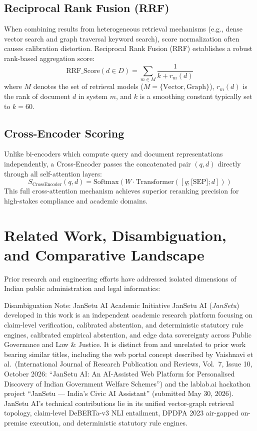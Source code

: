 \documentclass[12pt,a4paper,oneside]{report}
\begin{document}
\subsection{Reciprocal Rank Fusion (RRF)}
When combining results from heterogeneous retrieval mechanisms (e.g., dense vector search and graph traversal keyword search), score normalization often causes calibration distortion. Reciprocal Rank Fusion (RRF) establishes a robust rank-based aggregation score:
\begin{equation}
    \text{RRF\_Score}(d \in D) = \sum_{m \in M} \frac{1}{k + r_m(d)}
\end{equation}
where $M$ denotes the set of retrieval models ($M = \{\text{Vector}, \text{Graph}\}$), $r_m(d)$ is the rank of document $d$ in system $m$, and $k$ is a smoothing constant typically set to $k=60$.

\subsection{Cross-Encoder Scoring}
Unlike bi-encoders which compute query and document representations independently, a Cross-Encoder passes the concatenated pair $(q, d)$ directly through all self-attention layers:
\begin{equation}
    S_{\text{CrossEncoder}}(q, d) = \text{Softmax}(W \cdot \text{Transformer}([q; \text{[SEP]}; d]))
\end{equation}
This full cross-attention mechanism achieves superior reranking precision for high-stakes compliance and academic domains.

\section{Related Work, Disambiguation, and Comparative Landscape}
Prior research and engineering efforts have addressed isolated dimensions of Indian public administration and legal informatics:

\begin{infobox}{Disambiguation Note: JanSetu AI Academic Initiative}
JanSetu AI (\textit{JanSetu}) developed in this work is an independent academic research platform focusing on claim-level verification, calibrated abstention, and deterministic statutory rule engines, calibrated empirical abstention, and edge data sovereignty across Public Governance and Law \& Justice. It is distinct from and unrelated to prior work bearing similar titles, including the web portal concept described by Vaishnavi et al.\ (International Journal of Research Publication and Reviews, Vol.\ 7, Issue 10, October 2026: ``JanSetu AI: An AI-Assisted Web Platform for Personalised Discovery of Indian Government Welfare Schemes'') and the lablab.ai hackathon project ``JanSetu --- India's Civic AI Assistant'' (submitted May 30, 2026). JanSetu AI's technical contributions lie in its unified vector-graph retrieval topology, claim-level DeBERTa-v3 NLI entailment, DPDPA 2023 air-gapped on-premise execution, and deterministic statutory rule engines.
\end{infobox}
\end{document}
